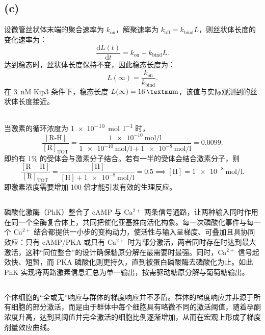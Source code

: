 \documentclass[10pt]{article}
\newcommand{\diff}{\mathrm{d}}
\begin{document}
\subsection*{(c)}
设微管丝状体末端的聚合速率为 $k_{\text{on}}$，解聚速率为 $k_{\text{off}} = k_{\text{bind}}L$，则丝状体长度的变化速率为：
\[
\frac{\diff L(t)}{\diff t} = k_{\text{on}} - k_{\text{bind}}L.
\]
达到稳态时，丝状体长度保持不变，因此稳态长度为：
\[
L(\infty) = \frac{k_{\text{on}}}{k_{\text{bind}}}.
\]
在 \qty{3}{nM} Kip3 条件下，稳态长度 \(L(\infty) = \qty{16}{\textmu\metre}\)，该值与实际观测到的丝状体长度接近。

\subsection{} %
当激素的循环浓度为 \qty{1e-10}{\mol\per\litre} 时，
\[
\frac{[\text{R-H}]}{[\text{R}]_{\text{TOT}}} = \frac{\qty{1e-10}{\mol\per\litre}}{\qty{1e-10}{\mol\per\litre} + \qty{1e-8}{\mol\per\litre}} = 0.0099.
\]
即约有 1\% 的受体会与激素分子结合。若有一半的受体会结合激素分子，则
\[
\frac{[\mathrm{R\!-\!H}]}{[\mathrm{R}]_{\mathrm{TOT}}} = \frac{[\text{H}]}{[\text{H}] + \qty{1e-8}{\mol\per\litre}} = 0.5 \implies [\text{H}] = \qty{1e-8}{\mol\per\litre}.
\]
即激素浓度需要增加 100 倍才能引发有效的生理反应。

\subsection{} %
磷酸化激酶（PhK）整合了 cAMP 与 Ca\(^{2+}\) 两条信号通路，让两种输入同时作用在同一个全酶复合体上，共同把催化亚基推向活化构象。每一次磷酸化事件与每一个 Ca\(^{2+}\) 结合都提供一小步的变构动力，使活性与输入呈梯度、可叠加且具协同效应：只有 cAMP/PKA 或只有 Ca\(^{2+}\) 时为部分激活，两者同时存在时达到最大激活，这种``同位整合''的设计确保糖原分解在最需要时最强。同时，Ca\(^{2+}\) 信号起效快、短暂，而 PKA 磷酸化则更持久，直到被蛋白磷酸酶去磷酸化为止。如此 PhK 实现将两路激素信息汇总为单一输出，按需驱动糖原分解与葡萄糖输出。

\subsection{} %
个体细胞的``全或无''响应与群体的梯度响应并不矛盾。群体的梯度响应并非源于所有细胞的部分激活，而是由于群体中每个细胞具有略微不同的激活阈值，随着孕酮浓度升高，达到其阈值并完全激活的细胞比例逐渐增加，从而在宏观上形成了梯度剂量效应曲线。
\end{document}
